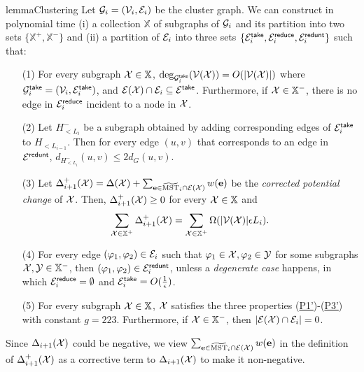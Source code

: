 \begin{restatable}{lemma}{Clustering}
	\label{lm:Clustering} Let $\mathcal{G}_i = (\mathcal{V}_i,\mathcal{E}_i)$ be the cluster graph. We can construct in polynomial time  (i) a collection $\mathbb{X}$ of subgraphs of $\mathcal{G}_i$ and its partition into two sets $\{\mathbb{X}^{+}, \mathbb{X}^{-}\}$ and (ii) a partition of $\mathcal{E}_i$ into three sets $\{\mathcal{E}_i^{\mathsf{take}}, \mathcal{E}_i^{\mathsf{reduce}}, \mathcal{E}_i^{\mathsf{redunt}}\}$ such that:
	\begin{enumerate}
		\item[(1)] For every subgraph $\mathcal{X} \in \mathbb{X}$,  $\deg_{\mathcal{G}^{\mathsf{take}}_i}(\mathcal{V}(\mathcal{X})) = O(|\mathcal{V}(\mathcal{X})|)$ where $\mathcal{G}^{\mathsf{take}}_i = (\mathcal{V}_i,\mathcal{E}_i^{\mathsf{take}})$, and $\mathcal{E}(\mathcal{X})\cap \mathcal{E}_i \subseteq \mathcal{E}^{\mathsf{take}}$. Furthermore, if $\mathcal{X} \in \mathbb{X}^{-}$, there is no edge in $\mathcal{E}_i^{\mathsf{reduce}}$ incident to a node in $\mathcal{X}$.
		
		\item[(2)] Let $H_{< L_i}^{-}$ be a subgraph obtained by adding corresponding edges of $\mathcal{E}_i^{\mathsf{take}}$ to $H_{< L_{i-1}}$.  Then for every edge $(u,v)$ that corresponds to an edge in $\mathcal{E}^{\mathsf{redunt}}$, $d_{H_{< L_i}^{-}}(u,v)\leq 2d_G(u,v)$. 
		
		\item[(3)] Let $\Delta_{i+1}^+(\mathcal{X}) = \Delta(\mathcal{X}) + \sum_{\mathbf{e} \in \widetilde{\mathrm{MST}}_i\cap \mathcal{E}(\mathcal{X})}w(\mathbf{e})$ be the \emph{corrected potential change} of $\mathcal{X}$. Then, $\Delta_{i+1}^+(\mathcal{X}) \geq 0$ for every $\mathcal{X} \in \mathbb{X}$ and 
		\begin{equation}\label{eq:averagePotential-t2}
			\sum_{\mathcal{X} \in \mathbb{X}^{+}} \Delta_{i+1}^+(\mathcal{X}) = \sum_{\mathcal{X} \in \mathbb{X}^{+}} \Omega(|\mathcal{V}(\mathcal{X})|\epsilon L_i). 
		\end{equation}
		\item[(4)] For every edge $(\varphi_1,\varphi_2)\in \mathcal{E}_i$ such that $\varphi_1 \in \mathcal{X}, \varphi_2 \in \mathcal{Y}$ for some subgraphs $\mathcal{X},\mathcal{Y} \in \mathbb{X}^{-}$, then $(\varphi_1,\varphi_2)\in \mathcal{E}^{\mathsf{redunt}}_i$, unless a \emph{degenerate case} happens, in which  $\mathcal{E}^{\mathsf{reduce}}_i = \emptyset$ and  $\mathcal{E}_i^{\mathsf{take}} = O(\frac{1}{\epsilon})$.%
		\item[(5)] For every subgraph $\mathcal{X} \in \mathbb{X}$, $\mathcal{X}$ satisfies the three properties (\hyperlink{P1'}{P1'})-(\hyperlink{P3'}{P3'}) with constant $g=223$. Furthermore, if $\mathcal{X} \in \mathbb{X}^{-}$, then $|\mathcal{E}(\mathcal{X})\cap \mathcal{E}_i| = 0$.
	\end{enumerate}	
\end{restatable}




Since  $\Delta_{i+1}(\mathcal{X})$ could be negative, we view $\sum_{\mathbf{e} \in \widetilde{\mathrm{MST}}_i\cap \mathcal{E}(\mathcal{X})}w(\mathbf{e})$ in the definition of $\Delta_{i+1}^+(\mathcal{X})$ as a corrective term to  $\Delta_{i+1}(\mathcal{X})$ to make it non-negative. 


